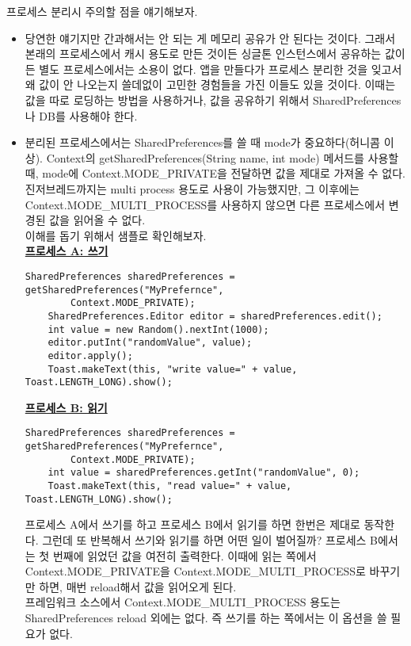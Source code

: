 프로세스 분리시 주의할 점을 얘기해보자.
\begin{itemize}
\item 당연한 얘기지만 간과해서는 안 되는 게 메모리 공유가 안 된다는 것이다. 그래서 본래의 프로세스에서 캐시 용도로 만든 것이든 싱글톤 인스턴스에서 공유하는 값이든 별도 프로세스에서는 소용이 없다.
앱을 만들다가 프로세스 분리한 것을 잊고서 왜 값이 안 나오는지 쓸데없이 고민한 경험들을 가진 이들도 있을 것이다.
이때는 값을 따로 로딩하는 방법을 사용하거나, 값을 공유하기 위해서 SharedPreferences나 DB를 사용해야 한다.
\item 분리된 프로세스에서는 SharedPreferences를 쓸 때 mode가 중요하다(허니콤 이상).
Context의 getSharedPreferences(String name, int mode) 메서드를 사용할 때, mode에
Context.MODE\_PRIVATE을 전달하면 값을 제대로 가져올 수 없다.
진저브레드까지는 multi process 용도로 사용이 가능했지만, 그 이후에는 Context.MODE\_MULTI\_PROCESS를 사용하지 않으면 다른 프로세스에서 변경된 값을 읽어올 수 없다.\\

이해를 돕기 위해서 샘플로 확인해보자.\\
\underline{\bfseries 프로세스 A: 쓰기}
\begin{lstlisting}[frame=single] 
    SharedPreferences sharedPreferences = getSharedPreferences("MyPrefernce", 
    	Context.MODE_PRIVATE);
    SharedPreferences.Editor editor = sharedPreferences.edit();
    int value = new Random().nextInt(1000);
    editor.putInt("randomValue", value);
    editor.apply();
    Toast.makeText(this, "write value=" + value, Toast.LENGTH_LONG).show();
\end{lstlisting}

\underline{\bfseries 프로세스 B: 읽기}
\begin{lstlisting}[frame=single] 
	SharedPreferences sharedPreferences = getSharedPreferences("MyPrefernce", 
		Context.MODE_PRIVATE);
    int value = sharedPreferences.getInt("randomValue", 0);
    Toast.makeText(this, "read value=" + value, Toast.LENGTH_LONG).show();
\end{lstlisting}

프로세스 A에서 쓰기를 하고 프로세스 B에서 읽기를 하면 한번은 제대로 동작한다.
그런데 또 반복해서 쓰기와 읽기를 하면 어떤 일이 벌어질까?
프로세스 B에서는 첫 번째에 읽었던 값을 여전히 출력한다.
이때에 읽는 쪽에서 Context.MODE\_PRIVATE을 Context.MODE\_MULTI\_PROCESS로 바꾸기만 하면, 매번 reload해서 값을 읽어오게 된다.\\

프레임워크 소스에서 Context.MODE\_MULTI\_PROCESS 용도는 SharedPreferences reload 외에는 없다. 
즉 쓰기를 하는 쪽에서는 이 옵션을 쓸 필요가 없다.\\
\end{itemize}



